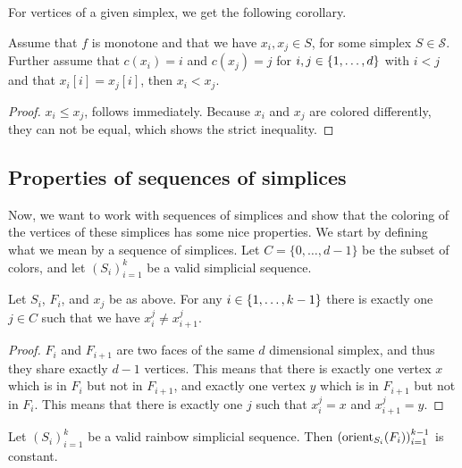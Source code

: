 For vertices of a given simplex, we get the following corollary.
\begin{corollary}\label{cor:monotone_coloring}
	Assume that $f$ is monotone and that we have $x_i, x_j \in S$, for some simplex $S\in \mathcal{S}$. Further assume that $c(x_i) = i$ and $c(x_j) = j$ for $i, j \in \left\{1, \dots, d\right\}$ with $i < j$ and that $x_i[i] = x_j[i]$, then $x_i < x_j$.
\end{corollary}
\begin{proof}
	$x_i \leq x_j$, follows immediately. Because $x_i$ and $x_j$ are colored differently, they can not be equal, which shows the strict inequality.
\end{proof}

\subsection{Properties of sequences of simplices}

Now, we want to work with sequences of simplices and show that the coloring of the vertices of these simplices has some nice properties. We start by defining what we mean by a sequence of simplices. Let $C = \{0, \dots, d-1\}$ be the subset of colors, and let ${\left(S_i\right)}_{i=1}^k$ be a valid simplicial sequence.
\begin{lemma}
	Let $S_i$, $F_i$, and $x_j$ be as above. For any $i \in \left\{1, \dots, k-1\right\}$ there is exactly one $j \in C$ such that we have $x_i^j \neq x_{i+1}^j$.
\end{lemma}
\begin{proof}
	$F_i$ and $F_{i+1}$ are two faces of the same $d$ dimensional simplex, and thus they share exactly $d-1$ vertices. This means that there is exactly one vertex $x$ which is in $F_i$ but not in $F_{i+1}$, and exactly one vertex $y$ which is in $F_{i+1}$ but not in $F_i$. This means that there is exactly one $j$ such that $x_i^j = x$ and $x_{i+1}^j = y$.
\end{proof}

\begin{lemma}\label{lem:consistent_orientation_of_transition_faces}
	Let ${\left(S_i\right)}_{i=1}^{k}$ be a valid rainbow simplicial sequence. Then ${\left(\operatorname{orient}_{S_i}(F_i)\right)}_{i=1}^{k-1}$ is constant.
\end{lemma}

